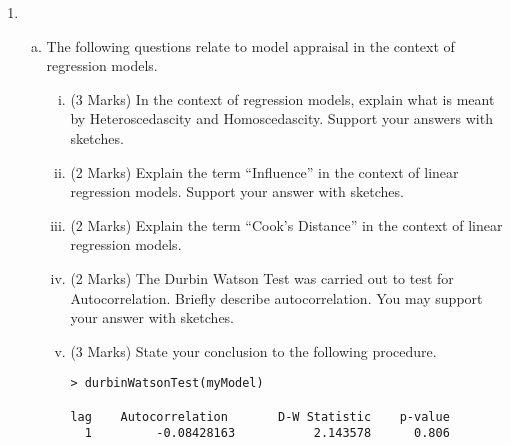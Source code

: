 \begin{enumerate}
\begin{enumerate}[(a)]
\end{enumerate}

\item 
\begin{enumerate}[(a)]
\item The following questions relate to model appraisal in the context of regression models.
%
\begin{enumerate}[(i)]

\item (3 Marks) In the context of regression models, explain what is meant by Heteroscedascity and Homoscedascity. Support your answers with sketches.
\item (2 Marks) Explain the term “Influence” in the context of linear regression models. Support your
answer with sketches.
\item (2 Marks) Explain the term “Cook’s Distance” in the context of linear regression models.
\item (2 Marks) The Durbin Watson Test was carried out to test for Autocorrelation. Briefly describe
autocorrelation. You may support your answer with sketches.
\item (3 Marks) State your conclusion to the following procedure.
\begin{framed}
\begin{verbatim}
> durbinWatsonTest(myModel)

lag    Autocorrelation       D-W Statistic    p-value
  1         -0.08428163           2.143578      0.806


\end{verbatim}
\end{framed}
\end{enumerate}
\end{enumerate}
\end{enumerate}
